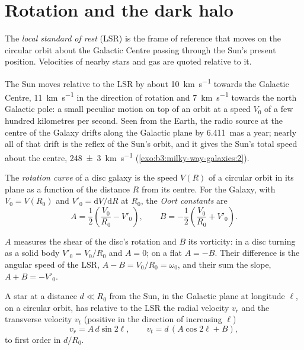 \section{Rotation and the dark halo}\label{sec:b3:milky-way-galaxies:rotation}

\begin{definition}\label{def:b3:milky-way-galaxies:lsr}
The \emph{local standard of rest} (LSR) is
the frame of reference that moves on the circular orbit about the Galactic
Centre passing through the Sun's present position. Velocities of nearby
stars and gas are quoted relative to it.
\end{definition}

The Sun moves relative to the LSR by about \qty{10}{km.s^{-1}} towards the
Galactic Centre, \qty{11}{km.s^{-1}} in the direction of rotation and
\qty{7}{km.s^{-1}} towards the north Galactic pole: a small peculiar
motion on top of an orbit at a speed $V_0$ of a few hundred kilometres
per second. Seen from the Earth, the radio source at the centre of the
Galaxy drifts along the Galactic plane by \qty{6.411}{mas} a year; nearly
all of that drift is the reflex of the Sun's orbit, and it gives the Sun's
total speed about the centre, \qty[separate-uncertainty=true]{248 \pm 3}{km.s^{-1}}
(\cref{exo:b3:milky-way-galaxies:2}).

\begin{definition}\label{def:b3:milky-way-galaxies:rotation-curve}
The \emph{rotation curve} of a disc galaxy is the
speed $V(R)$ of a circular orbit in its plane as a function of the
distance $R$ from its centre. For the Galaxy, with $V_0 = V(R_0)$ and
$V'_0 = \mathrm{d}V/\mathrm{d}R$ at $R_0$, the \emph{Oort
constants} are
\[
A = \frac12\left(\frac{V_0}{R_0} - V'_0\right), \qquad
B = -\frac12\left(\frac{V_0}{R_0} + V'_0\right).
\]
\end{definition}

$A$ measures the shear of the disc's rotation and $B$ its vorticity: in a
disc turning as a solid body $V'_0 = V_0/R_0$ and $A = 0$; on a flat
 $A = -B$. Their difference is the angular speed of the LSR,
$A - B = V_0/R_0 = \omega_0$, and their sum the slope, $A + B = -V'_0$.

\begin{theorem}\label{thm:b3:milky-way-galaxies:oort}
A star at a distance $d \ll R_0$ from the Sun, in the Galactic plane at
longitude $\ell$, on a circular orbit, has relative to the LSR the radial
velocity $v_r$ and the transverse velocity $v_t$ (positive in the
direction of increasing $\ell$)
\[
v_r = A\,d\sin 2\ell, \qquad v_t = d\,(A\cos 2\ell + B),
\]
to first order in $d/R_0$.
\end{theorem}

